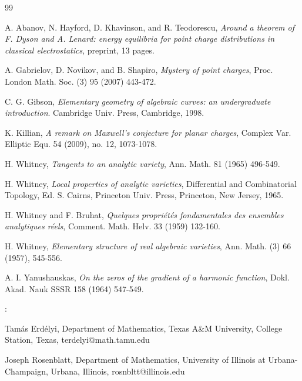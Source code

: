 \documentclass{article}
\theoremstyle{remark}
\numberwithin{equation}{section}
\begin{document}


\begin{thebibliography}{99}

 A. Abanov, N. Hayford, D. Khavinson, and R. Teodorescu, 
{\em Around a theorem of F. Dyson and A. Lenard: energy equilibria for point charge distributions in classical electrostatics}, preprint, 13 pages.  

 A. Gabrielov, D. Novikov, and B. Shapiro, 
{\em Mystery of point charges}, Proc. London Math. Soc. (3) 95 (2007) 443-472.

 C. G. Gibson, 
{\em Elementary geometry of algebraic curves: an undergraduate introduction}. Cambridge Univ. Press, Cambridge, 1998.

 K. Killian, {\em A remark on Maxwell's conjecture for planar charges}, Complex Var. Elliptic Equ. 54 (2009), no. 12, 1073-1078.

 H. Whitney, {\em Tangents to an analytic variety}, Ann. Math. 81 (1965) 496-549.

 H. Whitney, 
{\em Local properties of analytic varieties}, Differential and Combinatorial Topology, Ed. S. Cairns, Princeton Univ. Press, Princeton, New Jersey, 1965.

  H. Whitney and F. Bruhat, 
{\em Quelques propri\'et\'es fondamentales des ensembles analytiques r\'eels}, Comment. Math. Helv. 33 (1959) 132-160.

 H. Whitney, 
{\em Elementary structure of real algebraic varieties}, Ann.  Math. (3) 66 (1957), 545-556.

 A. I. Yanushauskas, 
{\em On the zeros of the gradient of a harmonic function}, Dokl. Akad. Nauk SSSR 158 (1964) 547-549.  
\end{thebibliography}
\bigskip

:
\medskip

\noindent Tam\'as Erd\'elyi, Department of Mathematics, Texas A\&M University, College Station, Texas,
terdelyi@math.tamu.edu
\medskip

\noindent Joseph Rosenblatt, Department of Mathematics, University of Illinois at Urbana-Champaign, Urbana, Illinois,
rosnbltt@illinois.edu
\medskip
\end{document}
